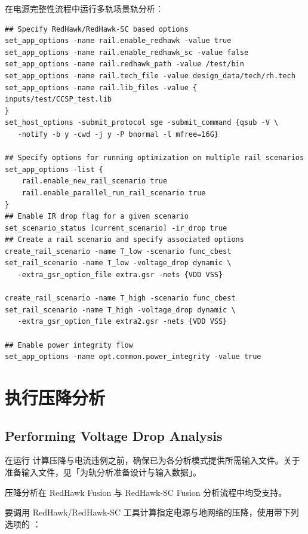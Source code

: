 在电源完整性流程中运行多轨场景轨分析：
\begin{lstlisting}
## Specify RedHawk/RedHawk-SC based options
set_app_options -name rail.enable_redhawk -value true
set_app_options -name rail.enable_redhawk_sc -value false
set_app_options -name rail.redhawk_path -value /test/bin
set_app_options -name rail.tech_file -value design_data/tech/rh.tech
set_app_options -name rail.lib_files -value {
inputs/test/CCSP_test.lib
}
set_host_options -submit_protocol sge -submit_command {qsub -V \
   -notify -b y -cwd -j y -P bnormal -l mfree=16G}

## Specify options for running optimization on multiple rail scenarios
set_app_options -list {
    rail.enable_new_rail_scenario true
    rail.enable_parallel_run_rail_scenario true
}
## Enable IR drop flag for a given scenario
set_scenario_status [current_scenario] -ir_drop true
## Create a rail scenario and specify associated options
create_rail_scenario -name T_low -scenario func_cbest
set_rail_scenario -name T_low -voltage_drop dynamic \
   -extra_gsr_option_file extra.gsr -nets {VDD VSS}

create_rail_scenario -name T_high -scenario func_cbest
set_rail_scenario -name T_high -voltage_drop dynamic \
   -extra_gsr_option_file extra2.gsr -nets {VDD VSS}

## Enable power integrity flow
set_app_options -name opt.common.power_integrity -value true
\end{lstlisting}

\section{执行压降分析}
\subsection*{Performing Voltage Drop Analysis}

\begin{noteBox}
在运行  计算压降与电流违例之前，确保已为各分析模式提供所需输入文件。关于准备输入文件，见「为轨分析准备设计与输入数据」。

压降分析在 RedHawk Fusion 与 RedHawk-SC Fusion 分析流程中均受支持。
\end{noteBox}

要调用 RedHawk/RedHawk-SC 工具计算指定电源与地网络的压降，使用带下列选项的 ：

